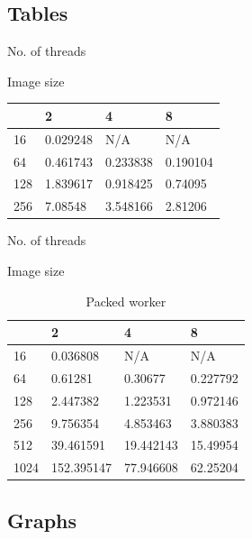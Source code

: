 \documentclass[11pt, oneside]{article}
\begin{document}
\vspace{-4mm}
\subsection{Tables}
\vspace{-3mm}

\begin{center}
No. of threads
\end{center}

\begin{table}[!th]
\centering
Image size
\begin{tabular}{l|lll}
    & 2        & 4        & 8        \\ \hline
16  & 0.029248 & N/A      & N/A      \\
64  & 0.461743 & 0.233838 & 0.190104 \\
128 & 1.839617 & 0.918425 & 0.74095  \\
256 & 7.08548  & 3.548166 & 2.81206 
\end{tabular}
\end{table}

\vspace{4mm}

\begin{center}
No. of threads
\end{center}

\begin{table}[!th]
\centering
\label{my-label}
Image size
\begin{tabular}{l|lll}
    & 2          & 4         & 8        \\ \hline
16   & 0.036808   & N/A       & N/A      \\
64   & 0.61281    & 0.30677   & 0.227792 \\
128  & 2.447382   & 1.223531  & 0.972146 \\
256  & 9.756354   & 4.853463  & 3.880383 \\
512  & 39.461591  & 19.442143 & 15.49954 \\
1024 & 152.395147 & 77.946608 & 62.25204
\end{tabular}
\caption{Packed worker}
\end{table}

\pagebreak
\subsection{Graphs}
\end{document}
